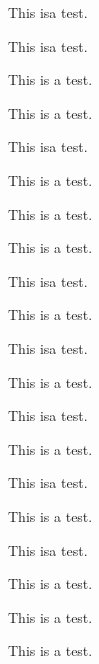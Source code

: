 \documentclass[twocolumn]{jarticle}
\begin{document}
\newpage
This is\linebreak a test.\par     %
This is\linebreak[4] a test.\par  %
This is \linebreak[4]a test.\par  %
This is \linebreak[4] a test.\par %
This is\linebreak[0] a test.\par  %
This is \linebreak[0]a test.\par  %
This is \linebreak[0] a test.\par %
This is a test.\par               %
This is\hskip20pt\linebreak a test.\par     %
This is \hskip20pt\linebreak a test.\par    %
This is\hskip20pt\linebreak[4]a test.\par   %
This is \hskip20pt\linebreak[4]a test.\par  %
This is\hskip20pt\linebreak[4] a test.\par  %
This is \hskip20pt\linebreak[4] a test.\par %
This is\hskip20pt\linebreak[0]a test.\par   %
This is \hskip20pt\linebreak[0]a test.\par  %
This is\hskip20pt\linebreak[0] a test.\par  %
This is \hskip20pt\linebreak[0] a test.\par %
This is\hskip20pt a test.\par               %
This is \hskip20pt a test.\par              %
\end{document}

